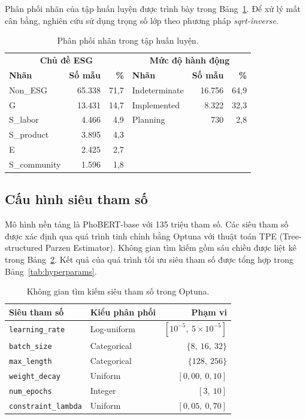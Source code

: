 Phân phối nhãn của tập huấn luyện được trình bày trong Bảng~\ref{tab:label_dist}. Để xử lý mất cân bằng, nghiên cứu sử dụng trọng số lớp theo phương pháp \textit{sqrt-inverse}.

\begin{table}[H]
\centering
\caption{Phân phối nhãn trong tập huấn luyện.}
\label{tab:label_dist}
\begin{tabular}{lrr|lrr}
\toprule
\multicolumn{3}{c|}{\textbf{Chủ đề ESG}} & \multicolumn{3}{c}{\textbf{Mức độ hành động}} \\
\textbf{Nhãn} & \textbf{Số mẫu} & \textbf{\%} & \textbf{Nhãn} & \textbf{Số mẫu} & \textbf{\%} \\
\midrule
Non\_ESG      & 65.338 & 71,7 & Indeterminate & 16.756 & 64,9 \\
G             & 13.431 & 14,7 & Implemented   &  8.322 & 32,3 \\
S\_labor      &  4.466 &  4,9 & Planning      &    730 &  2,8 \\
S\_product    &  3.895 &  4,3 &               &        &      \\
E             &  2.425 &  2,7 &               &        &      \\
S\_community  &  1.596 &  1,8 &               &        &      \\
\bottomrule
\end{tabular}
\end{table}


\subsection{Cấu hình siêu tham số}
\label{subsec:hyperparams}

Mô hình nền tảng là PhoBERT-base với 135 triệu tham số. Các siêu tham số được xác định qua quá trình tinh chỉnh bằng Optuna với thuật toán TPE (Tree-structured Parzen Estimator). Không gian tìm kiếm gồm sáu chiều được liệt kê trong Bảng~\ref{tab:tuning_space}. Kết quả của quá trình tối ưu siêu tham số được tổng hợp trong Bảng~\ref{tab:hyperparams}.

\begin{table}[H]
\centering
\caption{Không gian tìm kiếm siêu tham số trong Optuna.}
\label{tab:tuning_space}
\begin{tabular}{llr}
\toprule
\textbf{Siêu tham số} & \textbf{Kiểu phân phối} & \textbf{Phạm vi} \\
\midrule
\texttt{learning\_rate}      & Log-uniform & $[10^{-5},\ 5 \times 10^{-5}]$ \\
\texttt{batch\_size}         & Categorical & $\{8,\ 16,\ 32\}$ \\
\texttt{max\_length}         & Categorical & $\{128,\ 256\}$ \\
\texttt{weight\_decay}       & Uniform     & $[0{,}00,\ 0{,}10]$ \\
\texttt{num\_epochs}         & Integer     & $[3,\ 10]$ \\
\texttt{constraint\_lambda}  & Uniform     & $[0{,}05,\ 0{,}70]$ \\
\bottomrule
\end{tabular}
\end{table}

